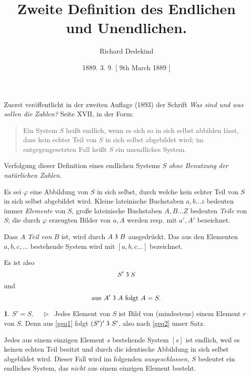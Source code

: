 \documentclass[leqno,hidelinks,a4paper]{article}
\theoremstyle{definition}
\newtheorem{satz}{\protect\satzname}
\newcommand{\satzname}{}
\renewcommand{\satzname}{\hspace{-4pt}.\ Satz}%
\renewcommand{\satzname}{\hspace{-4pt}.\ Theorem}%
\newcommand\Beweis{\medskip \newline $ \phantom{'.'} \rhd \ $}%
\newcommand\TeilVon{\mathrel{\raisebox{0.45ex}{$\mathfrak{3}$}}}
\begin{document}
\hypersetup{pageanchor=false}

\title{Zweite Definition des Endlichen und Unendlichen.}
\author{Richard Dedekind}
\date{1889. 3. 9. \phantom{} [ 9th March 1889 ]}
\maketitle

\thispagestyle{empty}

\begin{paracol}{2} %


\noindent Zuerst veröffentlicht in der zweiten Auflage (1893) der Schrift
\textit{\glqq Was sind und was sollen die Zahlen?\grqq{}} Seite XVII, in der Form:%

\begin{quote}
Ein System $S$ heißt endlich, wenn es sich so in sich selbst abbilden
lässt, dass kein echter Teil von $S$ in sich selbst abgebildet
wird; im entgegengesetzten Fall heißt $S$ ein unendliches System.
\end{quote}

Verfolgung dieser Definition eines endlichen Systems $S$
\emph{ohne Benutzung der natürlichen Zahlen}.

Es sei $\varphi$ eine Abbildung von $S$ in sich selbst, durch welche kein echter
Teil von $S$ in sich selbst abgebildet wird.
Kleine lateinische Buchstaben  $a, b \ldots z$ bedeuten immer \emph{Elemente} von
$S$, große lateinische Buchstaben $A, B \ldots Z$ bedeuten \emph{Teile} von $S$;
die durch $\varphi$ erzeugten Bilder von $a, A$ werden resp. mit $a', A'$ bezeichnet.

Dass $A$ \emph{Teil von} $B$ ist, wird durch $A \TeilVon B$ ausgedrückt. Das aus den
Elementen $a, b, c, \ldots $ bestehende System wird mit $[a, b, c \ldots]$ bezeichnet.

Es ist also
\begin{equation}\label{geq1}
				S' \TeilVon S
\end{equation}
und%
\begin{equation}\label{geq2}
		\text{aus } A' \TeilVon A \text{ folgt } A = S.
\end{equation}

\begin{satz}\label{gthm1}$S' = S$.
\Beweis
Jedes Element von $S$ ist Bild von (mindestens) einem Element $r$ von $S$. Denn
aus \eqref{geq1} folgt $(S')' \TeilVon S'$, also nach \eqref{geq2} unser Satz.
\end{satz}
Jedes aus einem einzigen Element $s$ bestehende System $[s]$ ist endlich, weil
es keinen echten Teil besitzt und durch die identische Abbildung in sich selbst
abgebildet wird. Dieser Fall wird im folgenden \emph{ausgeschlossen}, $S$ bedeutet
ein endliches System, das \emph{nicht} aus einem einzigen Element besteht.


\end{paracol}
\end{document}
